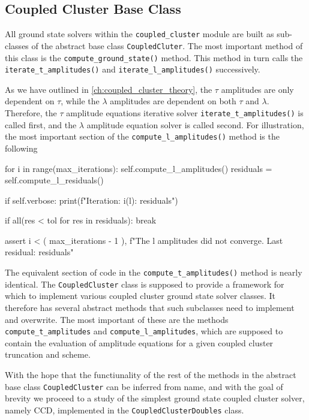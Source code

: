     \subsection{Coupled Cluster Base Class}

    All ground state solvers within the \lstinline{coupled_cluster} module are built 
    as sub-classes of the abstract base class \lstinline{CoupledCluter}. The most
    important method of this class is the \lstinline{compute_ground_state()} method.
    This method in turn calls the \lstinline{iterate_t_amplitudes()} and 
    \lstinline{iterate_l_amplitudes()} successively. 

    

    As we have outlined in 
    \autoref{ch:coupled_cluster_theory}, the $\tau$ amplitudes are only dependent on 
    $\tau$, while the $\lambda$ amplitudes are dependent on both $\tau$ and $\lambda$.
    Therefore, the $\tau$ amplitude equations iterative solver
    \lstinline{iterate_t_amplitudes()} is called first, and the $\lambda$ amplitude
    equation solver is called second.
    For illustration, the most important section of the \lstinline{compute_l_amplitudes()} method 
    is the following
    \begin{python}
    for i in range(max_iterations):
    self.compute_l_amplitudes()
    residuals = self.compute_l_residuals()

    if self.verbose:
        print(f"Iteration: {i}\tResiduals (l): {residuals}")

    if all(res < tol for res in residuals):
        break

    assert i < (
        max_iterations - 1
    ), f"The l amplitudes did not converge. Last residual: {residuals}" 
    \end{python}
    The equivalent section of code in the \lstinline{compute_t_amplitudes()} method is 
    nearly identical.
    The \lstinline{CoupledCluster} class is supposed to provide a framework for which 
    to implement various coupled cluster ground state solver classes. It therefore
    has several abstract methods that such subclasses need to implement and overwrite.
    The most important of these are the methods \lstinline{compute_t_amplitudes} 
    and \lstinline{compute_l_amplitudes}, which are supposed to contain the evaluation 
    of amplitude equations for a given coupled cluster truncation and scheme. 

    With the hope that the functiunality of the rest of the methods 
    in the abstract base class \lstinline{CoupledCluster} can be inferred from 
    name, and with the goal of brevity we proceed to a study of the simplest 
    ground state coupled cluster solver, namely CCD, implemented in the 
    \lstinline{CoupledClusterDoubles} class. 

